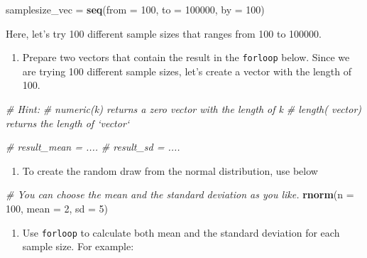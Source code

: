 \documentclass[]{book}
\newenvironment{Shaded}{\begin{snugshade}}{\end{snugshade}}
\newcommand{\KeywordTok}[1]{\textcolor[rgb]{0.13,0.29,0.53}{\textbf{#1}}}
\newcommand{\DataTypeTok}[1]{\textcolor[rgb]{0.13,0.29,0.53}{#1}}
\newcommand{\DecValTok}[1]{\textcolor[rgb]{0.00,0.00,0.81}{#1}}
\newcommand{\StringTok}[1]{\textcolor[rgb]{0.31,0.60,0.02}{#1}}
\newcommand{\CommentTok}[1]{\textcolor[rgb]{0.56,0.35,0.01}{\textit{#1}}}
\newcommand{\NormalTok}[1]{#1}
\providecommand{\tightlist}{%
  \setlength{\itemsep}{0pt}\setlength{\parskip}{0pt}}
\begin{document}
\begin{Shaded}
\begin{Highlighting}[]
\NormalTok{samplesize_vec =}\StringTok{ }\KeywordTok{seq}\NormalTok{(}\DataTypeTok{from =} \DecValTok{100}\NormalTok{, }\DataTypeTok{to =} \DecValTok{100000}\NormalTok{, }\DataTypeTok{by =} \DecValTok{100}\NormalTok{)}
\end{Highlighting}
\end{Shaded}

Here, let's try 100 different sample sizes that ranges from 100 to
100000.

\begin{enumerate}
\def\labelenumi{\arabic{enumi}.}
\setcounter{enumi}{2}
\tightlist
\item
  Prepare two vectors that contain the result in the \texttt{forloop}
  below. Since we are trying 100 different sample sizes, let's create a
  vector with the length of 100.
\end{enumerate}

\begin{Shaded}
\begin{Highlighting}[]
\CommentTok{# Hint:}
\CommentTok{# numeric(k) returns a zero vector with the length of k }
\CommentTok{# length( vector) returns the length of `vector`}

\CommentTok{# result_mean = .... }
\CommentTok{# result_sd = ....}
\end{Highlighting}
\end{Shaded}

\begin{enumerate}
\def\labelenumi{\arabic{enumi}.}
\setcounter{enumi}{3}
\tightlist
\item
  To create the random draw from the normal distribution, use below
\end{enumerate}

\begin{Shaded}
\begin{Highlighting}[]
\CommentTok{# You can choose the mean and the standard deviation as you like.}
\KeywordTok{rnorm}\NormalTok{(}\DataTypeTok{n =} \DecValTok{100}\NormalTok{, }\DataTypeTok{mean =} \DecValTok{2}\NormalTok{, }\DataTypeTok{sd =} \DecValTok{5}\NormalTok{)}
\end{Highlighting}
\end{Shaded}

\begin{enumerate}
\def\labelenumi{\arabic{enumi}.}
\setcounter{enumi}{3}
\tightlist
\item
  Use \texttt{forloop} to calculate both mean and the standard deviation
  for each sample size. For example:
\end{enumerate}
\end{document}
